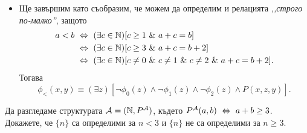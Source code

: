 \begin{example}
\begin{itemize}
  \item
    Ще завършим като съобразим, че можем да определим и релацията \emph{,,строго по-малко''}, защото
    \begin{align*}
      a < b & \iff (\exists c\in\Nat)[ c \geq 1\ \&\ a + c = b ]\\
            & \iff (\exists c\in\Nat)[ c \geq 3\ \&\ a + c = b + 2 ]\\
            & \iff (\exists c\in\Nat)[ c \neq 0\ \&\ c \neq 1\ \&\ c \neq 2\ \&\ a + c = b + 2 ].
    \end{align*}
    Тогава
    \[\phi_{<}(x,y) \equiv (\exists z)[\neg \phi_0(z) \land \neg \phi_1(z) \land \neg \phi_2(z) \land P(x,z,y)].\]
  \end{itemize}
\end{example}

\begin{example}
  Да разгледаме структурата $\mathcal{A} = (\mathbb{N}, P^{\mathcal{A}})$, където
  $P^{\mathcal{A}}(a,b) \ \Leftrightarrow\  a+b\geq 3$.
  Докажете, че $\{n\}$ са определими за $n < 3$ и $\{n\}$ не са определими за $n \geq 3$.
\end{example}


